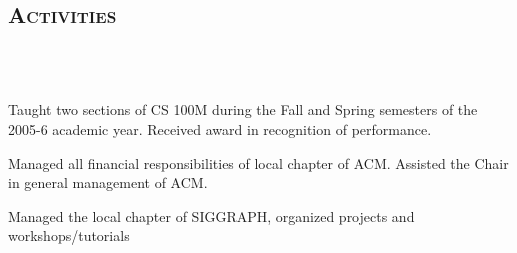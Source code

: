 \begin{resume}
\section{\textsc{Activities}}

\begin{formatb}
  \\
  \body\\
\end{formatb}

\begin{position}
Taught two sections of CS 100M during the Fall and Spring semesters of the 2005-6 academic year.  Received award in recognition of performance.
\end{position}

\begin{position}
Managed all financial responsibilities of local chapter of ACM.  Assisted the Chair in general management of ACM.
\end{position}

\begin{position}
Managed the local chapter of SIGGRAPH, organized projects and workshops/tutorials
\end{position}






\end{resume}

